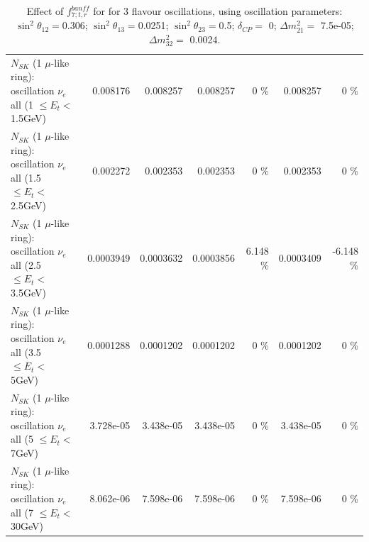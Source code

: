 \begin{table}
\begin{tabular}{| l | r | r | r  r | r  r |}
$N_{SK}$ (1 $\mu$-like ring): oscillation $\nu_{e}$ all (1 $\leq E_{t} <$ 1.5GeV) &        0.008176 &        0.008257 &        0.008257 &        0 \%  &        0.008257 &        0 \%  \\ 
$N_{SK}$ (1 $\mu$-like ring): oscillation $\nu_{e}$ all (1.5 $\leq E_{t} <$ 2.5GeV) &        0.002272 &        0.002353 &        0.002353 &        0 \%  &        0.002353 &        0 \%  \\ 
$N_{SK}$ (1 $\mu$-like ring): oscillation $\nu_{e}$ all (2.5 $\leq E_{t} <$ 3.5GeV) &       0.0003949 &       0.0003632 &       0.0003856 &    6.148 \%  &       0.0003409 &   -6.148 \%  \\ 
$N_{SK}$ (1 $\mu$-like ring): oscillation $\nu_{e}$ all (3.5 $\leq E_{t} <$ 5GeV) &       0.0001288 &       0.0001202 &       0.0001202 &        0 \%  &       0.0001202 &        0 \%  \\ 
 $N_{SK}$ (1 $\mu$-like ring): oscillation $\nu_{e}$ all (5 $\leq E_{t} <$ 7GeV) &       3.728e-05 &       3.438e-05 &       3.438e-05 &        0 \%  &       3.438e-05 &        0 \%  \\ 
$N_{SK}$ (1 $\mu$-like ring): oscillation $\nu_{e}$ all (7 $\leq E_{t} <$ 30GeV) &       8.062e-06 &       7.598e-06 &       7.598e-06 &        0 \%  &       7.598e-06 &        0 \%  \\ 
\hline
\hline
\end{tabular}
\caption{ Effect of $f_{7; t, r}^{banff}$ for for 3 flavour oscillations, using oscillation parameters:  $\sin^2\theta_{12} = $0.306; $\sin^2\theta_{13} = $0.0251; $\sin^2\theta_{23} = $0.5; $\delta_{CP} = $        0; $\Delta m^2_{21} = $    7.5e-05; $\Delta m^2_{32} = $    0.0024. }
\label{tab:num_banff_07_1RmuT_3f_osc_t13:0.0251}
\end{table}
\clearpage
